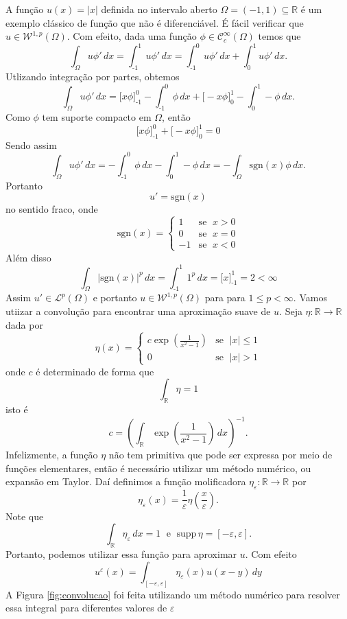 \documentclass[a4paper, 11pt]{book}
\theoremstyle{definition}
\newcommand{\bR}{\mathbb{R}}
\newcommand{\cC}{\mathcal{C}}
\newcommand{\cL}{\mathcal{L}}
\newcommand{\cW}{\mathcal{W}}
\newcommand{\supp}{\mathrm{supp}\,}
\newcommand{\sgn}{\mathrm{sgn}}
\begin{document}
\begin{ex}
    A função $u(x) = |x|$ definida no intervalo aberto $\Omega = (-1,1) \subseteq \bR$ é um exemplo clássico de função que não é diferenciável. É fácil verificar que $u \in \cW^{1,p}(\Omega)$. Com efeito, dada uma função $\phi \in \cC^\infty_c(\Omega)$ temos que
    \[
        \int_\Omega u \phi' \,dx = \int_{\text{-}1}^1 u \phi' \,dx = \int_{\text{-}1}^0 u \phi' \,dx + \int_0^1 u \phi' \,dx.
    \]
    Utlizando integração por partes, obtemos
    \[
        \int_\Omega u \phi'\,dx = \bigg[ x\phi \bigg]_{\text{-}1}^0 - \int_{\text{-}1}^0 \phi \,dx + \bigg[ -x \phi \bigg]_0^1 - \int_0^1 -\phi \,dx.
    \]
    Como $\phi$ tem suporte compacto em $\Omega$, então
    \[
       \bigg[ x\phi \bigg]_{\text{-}1}^0 + \bigg[ -x \phi \bigg]_0^1 = 0
    \]
    Sendo assim
    \[
        \int_\Omega u \phi'\,dx = - \int_{\text{-}1}^0 \phi \,dx - \int_0^1 -\phi \,dx = -\int_\Omega \sgn(x)\phi \,dx.
    \]
    Portanto
    \[
        u'= \sgn(x)
    \]
    no sentido fraco, onde
    \[
        \sgn(x) = 
        \left\{ 
            \begin{array}{rr}
                1 & \text{se }\; x > 0\\
                0 & \text{se }\; x = 0\\
                -1& \text{se }\; x < 0
            \end{array}
        \right.
    \]
    Além disso
    \[
        \int_\Omega |\sgn(x)|^p \,dx = \int_{\text{-}1}^1 1^p \,dx = \bigg[ x \bigg]^1_{\text{-}1} = 2 < \infty
    \]
    Assim $u'\in \cL^p(\Omega)$ e portanto $u \in \cW^{1,p}(\Omega)$ para para $1 \leqslant p < \infty$.
    Vamos utiizar a convolução para encontrar uma aproximação suave de $u$. 
    Seja $\eta : \bR \to \bR$ dada por
    \[
        \eta(x) = \left\{ 
            \begin{array}{lr}
                c \exp\left(\frac{1}{x^2 - 1} \right) & \text{se }\; |x| \leqslant 1\\
                0 & \text{se }\; |x| > 1
            \end{array}
        \right.
    \]
    onde $c$ é determinado de forma que
    \[
        \int_{\bR} \eta = 1
    \]
    isto é
    \[
        c = \left( \int_\bR \exp \left(\frac{1}{x^2 - 1} \right) \, dx\right)^{-1}.
    \]
    Infelizmente, a função $\eta$ não tem primitiva que pode ser expressa por meio de funções elementares, então é necessário utilizar um método numérico, ou expansão em Taylor.
    Daí definimos a função molificadora $\eta_\varepsilon : \bR \to \bR$ por
    \[
        \eta_\varepsilon(x) = \frac{1}{\varepsilon} \eta\left( \frac{x}{\varepsilon} \right).
    \]
    Note que
    \[
        \int_\bR \eta_\varepsilon \, dx = 1 \;\text{ e }\; \supp \eta = [-\varepsilon,\varepsilon].
    \]
    Portanto, podemos utilizar essa função para aproximar $u$. Com efeito
    \[
        u^\varepsilon(x) = \int_{[-\varepsilon,\varepsilon]} \eta_\varepsilon(x) u(x-y) \,dy
    \]
    A Figura \ref{fig:convolucao} foi feita utilizando um método numérico para resolver essa integral para diferentes valores de $\varepsilon$ 


\end{ex}
\end{document}
